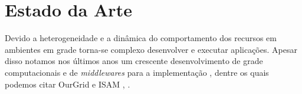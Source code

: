 \section{Estado da Arte}
\label{cap:estado da arte}

Devido a heterogeneidade e a dinâmica do comportamento dos recursos em ambientes em grade torna-se complexo desenvolver e executar aplicações. Apesar disso notamos nos últimos anos um crescente desenvolvimento de grade computacionais e de \emph{middlewares} para a implementação \cite{Silva}, \cite{Santos} dentre os quais podemos citar OurGrid \cite{Silva} e ISAM \cite{Jr.2002}, \cite{Nino2006}.
